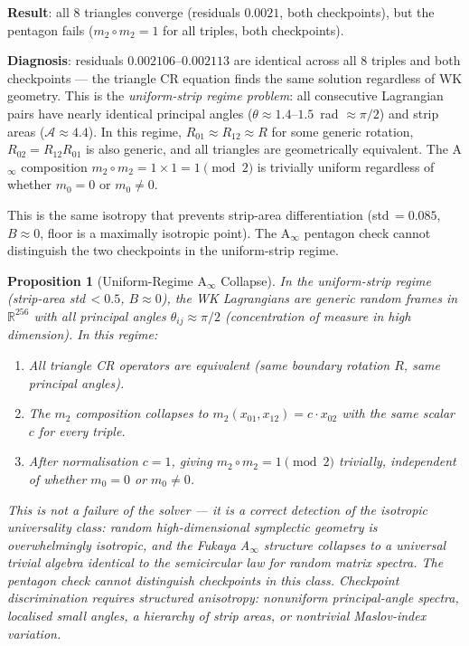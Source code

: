 \documentclass[11pt]{amsart}
\newtheorem{proposition}[theorem]{Proposition}
\begin{document}
\textbf{Result}: all 8 triangles converge (residuals $0.0021$,
both checkpoints), but the pentagon fails ($m_2 \circ m_2 = 1$
for all triples, both checkpoints).

\textbf{Diagnosis}: residuals $0.002106$--$0.002113$ are identical
across all 8 triples and both checkpoints --- the triangle CR equation
finds the same solution regardless of WK geometry.
This is the \emph{uniform-strip regime problem}: all consecutive
Lagrangian pairs have nearly identical principal angles
($\theta \approx 1.4$--$1.5$~rad $\approx \pi/2$) and strip areas
($\mathcal{A} \approx 4.4$).
In this regime, $R_{01} \approx R_{12} \approx R$ for some generic
rotation, $R_{02} = R_{12} R_{01}$ is also generic, and all
triangles are geometrically equivalent.
The A$_\infty$ composition $m_2 \circ m_2 = 1 \times 1 = 1 \pmod{2}$
is trivially uniform regardless of whether $m_0 = 0$ or $m_0 \neq 0$.

This is the same isotropy that prevents strip-area differentiation
(std\,$= 0.085$, $B \approx 0$, floor is a maximally isotropic point).
The A$_\infty$ pentagon check cannot distinguish the two checkpoints
in the uniform-strip regime.

\begin{proposition}[Uniform-Regime A$_\infty$ Collapse]
\label{prop:uniform_ainf}
In the uniform-strip regime (strip-area std\,$< 0.5$, $B \approx 0$),
the WK Lagrangians are generic random frames in $\mathbb{R}^{256}$
with all principal angles $\theta_{ij} \approx \pi/2$
(concentration of measure in high dimension).
In this regime:
\begin{enumerate}
\item All triangle CR operators are equivalent
  (same boundary rotation $R$, same principal angles).
\item The $m_2$ composition collapses to $m_2(x_{01}, x_{12}) = c \cdot x_{02}$
  with the same scalar $c$ for every triple.
\item After normalisation $c = 1$, giving $m_2 \circ m_2 = 1 \pmod{2}$
  trivially, independent of whether $m_0 = 0$ or $m_0 \neq 0$.
\end{enumerate}
This is not a failure of the solver --- it is a correct detection of
the \emph{isotropic universality class}: random high-dimensional
symplectic geometry is overwhelmingly isotropic, and the Fukaya
A$_\infty$ structure collapses to a universal trivial algebra
identical to the semicircular law for random matrix spectra.
The pentagon check cannot distinguish checkpoints in this class.
Checkpoint discrimination requires \emph{structured anisotropy}:
nonuniform principal-angle spectra, localised small angles,
a hierarchy of strip areas, or nontrivial Maslov-index variation.
\end{proposition}
\end{document}
